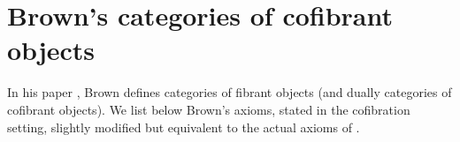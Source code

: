 
\section{Brown's categories of cofibrant objects}
In his paper \cite{Brown}, Brown defines categories of fibrant objects (and dually categories of cofibrant objects). We list below Brown's axioms, stated in the cofibration setting, slightly modified but equivalent to the actual axioms of \cite{Brown}.

